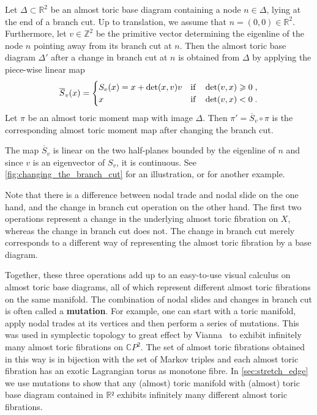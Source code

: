 \documentclass[12pt,a4paper,abstract=true,final]{scrartcl}
\begin{document}
\begin{proposition}
    \label{thm:change_branchcut}
    Let $\Delta \subset \mathbb{R}^2$ be an almost toric base diagram containing a node $n \in \Delta$, lying at the end of a branch cut.
Up to translation, we assume that $n = (0,0) \in \mathbb{R}^2$.
Furthermore, let $v \in \mathbb{Z}^2$ be the primitive vector determining the eigenline of the node $n$ pointing away from its branch cut at $n$.
Then the almost toric base diagram $\Delta'$ after a change in branch cut at $n$ is obtained from $\Delta$ by applying the piece-wise linear map 
    \begin{equation}
    \label{eq:half-shear}
        \overline{S}_v(x) =
        \begin{cases}
            S_v(x) = x + \det(x,v)v & \qif* \det(v,x) \geqslant 0 \;, \\
            x & \qif* \det(v,x) < 0 \;.
        \end{cases}
    \end{equation}
    Let $\pi$ be an almost toric moment map with image $\Delta$.
Then $\pi' = \overline{S}_v \circ \pi$ is the corresponding almost toric moment map after changing the branch cut.
\end{proposition}

The map $\overline{S}_v$ is linear on the two half-planes bounded by the eigenline of $n$ and since $v$ is an eigenvector of $S_v$, it is continuous.
See \cref{fig:changing_the_branch_cut} for an illustration, or \cite[Example 8.15]{evans2021atfs} for another example.

Note that there is a difference between nodal trade and nodal slide on the one hand, and the change in branch cut operation on the other hand.
The first two operations represent a change in the underlying almost toric fibration on $X$, whereas the change in branch cut does not.
The change in branch cut merely corresponds to a different way of representing the almost toric fibration by a base diagram.

Together, these three operations add up to an easy-to-use visual calculus on almost toric base diagrams, all of which represent different almost toric fibrations on the same manifold.
The combination of nodal slides and changes in branch cut is often called a \textbf{mutation}.
For example, one can start with a toric manifold, apply nodal trades at its vertices and then perform a series of mutations.
This was used in symplectic topology to great effect by Vianna~\cite{Via16} to exhibit infinitely many almost toric fibrations on $\mathbb{C}P^2$.
The set of almost toric fibrations obtained in this way is in bijection with the set of Markov triples and each almost toric fibration has an exotic Lagrangian torus as monotone fibre.
In \cref{sec:stretch_edge} we use mutations to show that any (almost) toric manifold with (almost) toric base diagram contained in $ℝ²$ exhibits infinitely many different almost toric fibrations.
\end{document}
